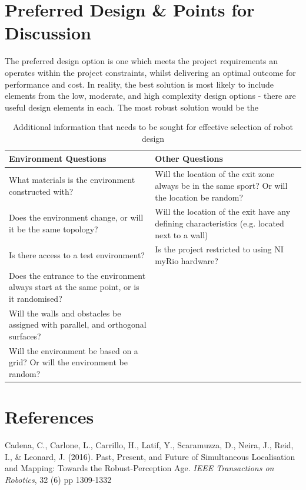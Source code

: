 \documentclass[a4paper]{article}
\begin{document}
\section{Preferred Design \& Points for Discussion}
The preferred design option is one which meets the project requirements an operates within the project constraints, whilst delivering an optimal outcome for performance and cost. In reality, the best solution is most likely to include elements from the low, moderate, and high complexity design options - there are useful design elements in each. The most robust solution would be the 
\begin{table}[h]
\centering
\caption{Additional information that needs to be sought for effective selection of robot design}
\begin{tabular}{p{8cm}p{8cm}}
\toprule
\textbf{Environment Questions} & \textbf{Other Questions}\\
\midrule
What materials is the environment constructed with? & Will the location of the exit zone always be in the same sport? Or will the location be random?\\
Does the environment change, or will it be the same topology? & Will the location of the exit have any defining characteristics (e.g. located next to a wall) \\
Is there access to a test environment? & Is the project restricted to using NI myRio hardware?\\
Does the entrance to the environment always start at the same point, or is it randomised? & \\
Will the walls and obstacles be assigned with parallel, and orthogonal surfaces? & \\
Will the environment be based on a grid? Or will the environment be random? & \\
\bottomrule
\end{tabular}
\end{table}

\section{References}
Cadena, C., Carlone, L., Carrillo, H., Latif, Y., Scaramuzza, D., Neira, J., Reid, I., \& Leonard, J. (2016). Past, Present, and Future of Simultaneous Localisation and Mapping: Towards the Robust-Perception Age. \textit{IEEE Transactions on Robotics}, 32 (6) pp 1309-1332\\
\end{document}
